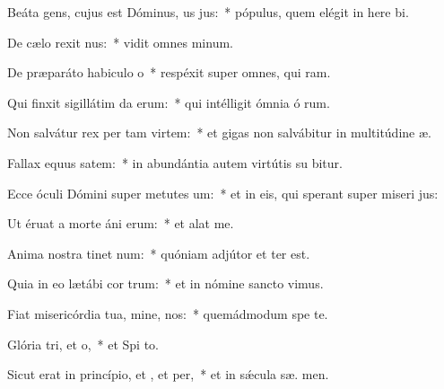 \item Beáta gens, cujus est Dóminus, us jus:~* pópulus, quem elégit in here bi.
\item De cælo rexit nus:~* vidit omnes  minum.
\item De præparáto habiculo o~* respéxit super omnes, qui  ram.
\item Qui finxit sigillátim da erum:~* qui intélligit ómnia ó rum.
\item Non salvátur rex per tam virtem:~* et gigas non salvábitur in multitúdine  æ.
\item Fallax equus  satem:~* in abundántia autem virtútis su  bitur.
\item Ecce óculi Dómini super metutes um:~* et in eis, qui sperant super miseri jus:
\item Ut éruat a morte áni erum:~* et alat   me.
\item Anima nostra tinet num:~* quóniam adjútor et  ter est.
\item Quia in eo lætábi cor trum:~* et in nómine sancto  vimus.
\item Fiat misericórdia tua, mine,  nos:~* quemádmodum spe  te.
\item Glória tri, et o,~* et Spi to.
\item Sicut erat in princípio, et , et per,~* et in sǽcula sæ. men.
